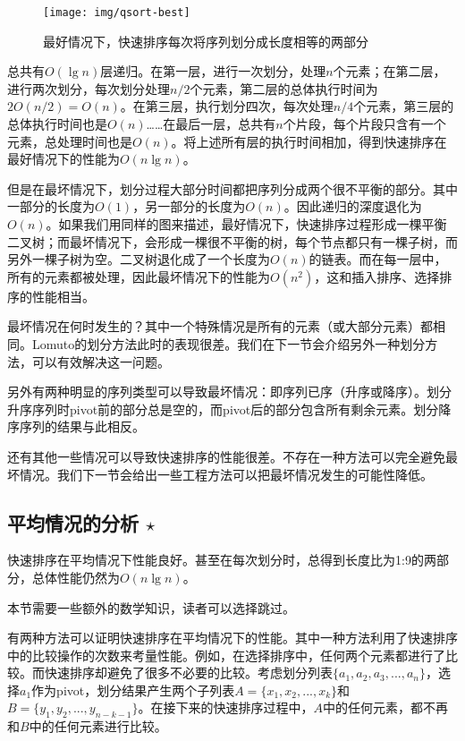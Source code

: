 \documentclass{ctexart}
\begin{document}
\begin{figure}[htbp]
 \centering
 \texttt{[image: img/qsort-best]}
 \caption{最好情况下，快速排序每次将序列划分成长度相等的两部分}
 \label{fig:qsort-best}
\end{figure}

总共有$O(\lg n)$层递归。在第一层，进行一次划分，处理$n$个元素；在第二层，进行两次划分，每次划分处理$n/2$个元素，第二层的总体执行时间为$2 O(n/2) = O(n)$。在第三层，执行划分四次，每次处理$n/4$个元素，第三层的总体执行时间也是$O(n)$……在最后一层，总共有$n$个片段，每个片段只含有一个元素，总处理时间也是$O(n)$。将上述所有层的执行时间相加，得到快速排序在最好情况下的性能为$O(n \lg n)$。

但是在最坏情况下，划分过程大部分时间都把序列分成两个很不平衡的部分。其中一部分的长度为$O(1)$，另一部分的长度为$O(n)$。因此递归的深度退化为$O(n)$。如果我们用同样的图来描述，最好情况下，快速排序过程形成一棵平衡二叉树；而最坏情况下，会形成一棵很不平衡的树，每个节点都只有一棵子树，而另外一棵子树为空。二叉树退化成了一个长度为$O(n)$的链表。而在每一层中，所有的元素都被处理，因此最坏情况下的性能为$O(n^2)$，这和插入排序、选择排序的性能相当。

最坏情况在何时发生的？其中一个特殊情况是所有的元素（或大部分元素）都相同。Lomuto的划分方法此时的表现很差。我们在下一节会介绍另外一种划分方法，可以有效解决这一问题。

另外有两种明显的序列类型可以导致最坏情况：即序列已序（升序或降序）。划分升序序列时pivot前的部分总是空的，而pivot后的部分包含所有剩余元素。划分降序序列的结果与此相反。

还有其他一些情况可以导致快速排序的性能很差。不存在一种方法可以完全避免最坏情况。我们下一节会给出一些工程方法可以把最坏情况发生的可能性降低。

\subsection{平均情况的分析 $\star$}

快速排序在平均情况下性能良好。甚至在每次划分时，总得到长度比为1:9的两部分，总体性能仍然为$O(n \lg n)$\cite{CLRS}。

本节需要一些额外的数学知识，读者可以选择跳过。

有两种方法可以证明快速排序在平均情况下的性能。其中一种方法利用了快速排序中的比较操作的次数来考量性能\cite{CLRS}。例如，在选择排序中，任何两个元素都进行了比较。而快速排序却避免了很多不必要的比较。考虑划分列表$\{ a_1, a_2, a_3, ..., a_n\}$，选择$a_1$作为pivot，划分结果产生两个子列表$A = \{x_1, x_2, ..., x_k\}$和$B = \{ y_1, y_2, ..., y_{n-k-1} \}$。在接下来的快速排序过程中，$A$中的任何元素，都不再和$B$中的任何元素进行比较。
\end{document}
